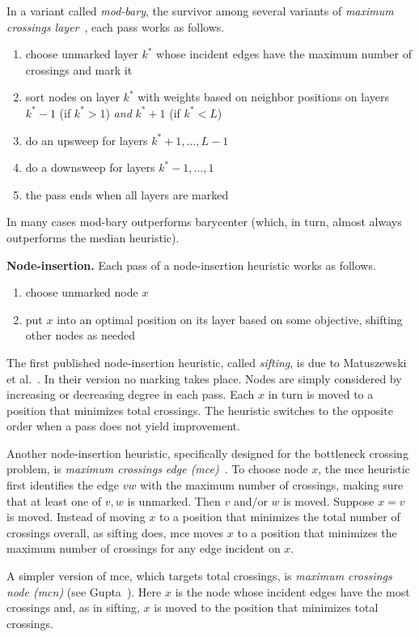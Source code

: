 In a variant called \emph{mod-bary}, the survivor among several variants of \emph{maximum crossings layer}~\cite{2008-MSThesis-Gupta}, each pass works as follows.
\begin{enumerate}
    \item choose unmarked layer $k^*$ whose incident edges have the maximum number of crossings and mark it
    \item sort nodes on layer $k^*$ with weights based on neighbor positions on layers $k^*-1$ (if $k^* >1$) \emph{and} $k^*+1$ (if $k^*<L$)
    \item do an upsweep for layers $k^*+1,\ldots,L-1$
    \item do a downsweep for layers $k^*-1,\ldots,1$
    \item the pass ends when all layers are marked
\end{enumerate}
In many cases mod-bary outperforms barycenter (which, in turn, almost always outperforms the median heuristic).

\medskip
\noindent \textbf{Node-insertion.}
Each pass of a node-insertion heuristic works as follows.
\begin{enumerate}
    \item choose unmarked node $x$
    \item put $x$ into an optimal position on its layer based on some objective, shifting other nodes as needed
\end{enumerate}

The first published node-insertion heuristic, called \emph{sifting}, is due to Matuszewski et al.~\cite{1999-GD-Matuszewski-p217}. In their version no marking takes place.
Nodes are simply considered by increasing or decreasing degree in each pass.
Each $x$ in turn is moved to a position that minimizes total crossings.
The heuristic switches to the opposite order when a pass does not yield improvement.

Another node-insertion heuristic, specifically designed for the bottleneck crossing problem, is \emph{maximum crossings edge (mce)}~\cite{2012-JEA-Stallmann}. To choose node $x$, the mce heuristic first identifies the edge $vw$ with the maximum number of crossings, making sure that at least one of $v,w$ is unmarked. Then $v$ and/or $w$ is moved. Suppose $x=v$ is moved. Instead of moving $x$ to a position that minimizes the total number of crossings overall, as sifting does, mce moves $x$ to a position that minimizes the maximum number of crossings for any edge incident on $x$.

A simpler version of mce, which targets total crossings, is \emph{maximum crossings node (mcn)} (see Gupta~\cite{2008-MSThesis-Gupta}). Here $x$ is the node whose incident edges have the most crossings and, as in sifting, $x$ is moved to the position that minimizes total crossings.

